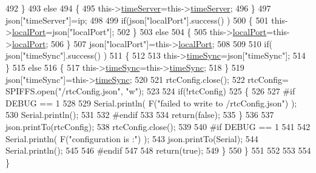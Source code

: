 \begin{DoxyCode}
492             \}
493             \textcolor{keywordflow}{else}
494             \{
495                 this->\hyperlink{classCoolTime_ad2b9858f399108cb440dd1e908916f04}{timeServer}=this->\hyperlink{classCoolTime_ad2b9858f399108cb440dd1e908916f04}{timeServer};
496             \}
497             json[\textcolor{stringliteral}{"timeServer"}]=ip;
498             
499             \textcolor{keywordflow}{if}(json[\textcolor{stringliteral}{"localPort"}].success() )
500             \{                       
501                 this->\hyperlink{classCoolTime_a2f777da44d7ba678be8185299e9b49d1}{localPort}=json[\textcolor{stringliteral}{"localPort"}];
502             \}
503             \textcolor{keywordflow}{else}
504             \{
505                 this->\hyperlink{classCoolTime_a2f777da44d7ba678be8185299e9b49d1}{localPort}=this->\hyperlink{classCoolTime_a2f777da44d7ba678be8185299e9b49d1}{localPort};
506             \}
507             json[\textcolor{stringliteral}{"localPort"}]=this->\hyperlink{classCoolTime_a2f777da44d7ba678be8185299e9b49d1}{localPort};
508 
509 
510             \textcolor{keywordflow}{if}( json[\textcolor{stringliteral}{"timeSync"}].success() )
511             \{
512 
513                 this->\hyperlink{classCoolTime_a9d032e76c3470a15b3bbbc52af6463f7}{timeSync}=json[\textcolor{stringliteral}{"timeSync"}];
514             \}
515             \textcolor{keywordflow}{else}
516             \{
517                 this->\hyperlink{classCoolTime_a9d032e76c3470a15b3bbbc52af6463f7}{timeSync}=this->\hyperlink{classCoolTime_a9d032e76c3470a15b3bbbc52af6463f7}{timeSync};
518             \}
519             json[\textcolor{stringliteral}{"timeSync"}]=this->\hyperlink{classCoolTime_a9d032e76c3470a15b3bbbc52af6463f7}{timeSync};
520 
521             rtcConfig.close();
522             rtcConfig= SPIFFS.open(\textcolor{stringliteral}{"/rtcConfig.json"}, \textcolor{stringliteral}{"w"});
523             
524             \textcolor{keywordflow}{if}(!rtcConfig)
525             \{
526             
527 \textcolor{preprocessor}{            #if DEBUG == 1}
528 
529                 Serial.println( F(\textcolor{stringliteral}{"failed to write to /rtcConfig.json"}) );
530                 Serial.println();
531             
532 \textcolor{preprocessor}{            #endif}
533 
534                 \textcolor{keywordflow}{return}(\textcolor{keyword}{false});
535             \}
536             
537             json.printTo(rtcConfig);
538             rtcConfig.close();
539 
540 \textcolor{preprocessor}{        #if DEBUG == 1 }
541 
542             Serial.println( F(\textcolor{stringliteral}{"configuration is :"}) );
543             json.printTo(Serial);
544             Serial.println();
545         
546 \textcolor{preprocessor}{        #endif}
547         
548             \textcolor{keywordflow}{return}(\textcolor{keyword}{true}); 
549         \}
550     \}   
551 
552 
553 
554 \}
\end{DoxyCode}
